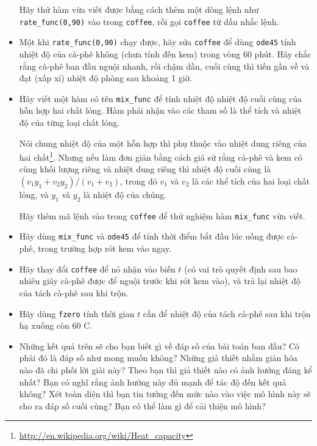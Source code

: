 \documentclass[12pt]{book}
\begin{document}
\begin{ex}
\begin{itemize}
Hãy thử hàm vừa viết được bằng cách thêm một dòng lệnh như 
\verb#rate_func(0,90)# vào trong {\tt coffee}, 
rồi gọi {\tt coffee} từ dấu nhắc lệnh.

\item Một khi \verb#rate_func(0,90)# chạy được, hãy sửa
{\tt coffee} để dùng {\tt ode45} tính nhiệt độ của cà-phê không (chưa tính
đến kem) trong vòng 60 phút. Hãy chắc rằng cà-phê ban đầu
nguội nhanh, rồi chậm dần, cuối cùng thì tiến gần về và đạt (xấp xỉ)
nhiệt độ phòng sau khoảng 1 giờ.

\item Hãy viết một hàm có tên \verb#mix_func# để tính nhiệt độ 
nhiệt độ cuối cùng của hỗn hợp hai chất lỏng. Hàm phải nhận vào
các tham số là thể tích và nhiệt độ của từng loại chất lỏng.

Nói chung nhiệt độ của một hỗn hợp thì phụ thuộc vào nhiệt dung
riêng của hai chất\footnote{\url{http://en.wikipedia.org/wiki/Heat_capacity}}.
Nhưng nếu làm đơn giản bằng cách giả sử rằng cà-phê và kem có
cùng khối lượng riêng và nhiệt dung riêng thì nhiệt độ cuối cùng là
$(v_1 y_1 + v_2 y_2) / (v_1 + v_2)$, trong đó $v_1$ và $v_2$ là
các thể tích của hai loại chất lỏng, và $y_1$ và $y_2$ là nhiệt độ của chúng.

Hãy thêm mã lệnh vào trong {\tt coffee} để thử nghiệm hàm 
\verb#mix_func# vừa viết.

\item Hãy dùng \verb#mix_func# và {\tt ode45} để tính thời điểm
bắt đầu lúc uống được cà-phê, trong trường hợp rót kem vào ngay.

\item Hãy thay đổi {\tt coffee} để nó nhận vào biến $t$ (có vai trò
quyết định sau bao nhiêu giây cà-phê được để nguội trước khi rót kem
vào), và trả lại nhiệt độ của tách cà-phê sau khi trộn.

\item Hãy dùng {\tt fzero} tính thời gian $t$ cần để nhiệt độ của
tách cà-phê sau khi trộn hạ xuống còn 60 \degree C.

\item Những kết quả trên sẽ cho bạn biết gì về đáp số của bài toán
ban đầu? Có phải đó là đáp số như mong muốn không? Những
giả thiết nhằm giản hóa nào đã chi phối lời giải này? Theo bạn thì
giả thiết nào có ảnh hưởng đáng kể nhất? Bạn có nghĩ rằng ảnh
hưởng này đủ mạnh để tác độ đến kết quả không? Xét toàn diện
thì bạn tin tưởng đến mức nào vào việc mô hình này sẽ cho ra 
đáp số cuối cùng? Bạn có thể làm gì để cải thiện mô hình?

\end{itemize}

\end{ex}
\end{document}

